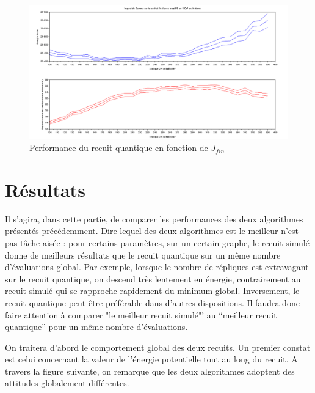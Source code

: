 \documentclass{article}%
\begin{document}
	\begin{figure}[!h]
	\begin{center}
	\includegraphics[scale=0.25]{gamma.png}
	\caption{Performance du recuit quantique en fonction de $ J_{fin} $}
	\label{gamma}
	\end{center}
	\end{figure}


\clearpage
\section{Résultats}

\vspace{1cm}

		Il s'agira, dans cette partie, de comparer les performances des deux algorithmes présentés précédemment. Dire lequel des deux algorithmes est le meilleur n'est pas tâche aisée : pour certains paramètres, sur un certain graphe, le recuit simulé donne de meilleurs résultats que le recuit quantique sur un même nombre d'évaluations global. Par exemple, lorsque le nombre de répliques est extravagant sur le recuit quantique, on descend très lentement en énergie, contrairement au recuit simulé qui se rapproche rapidement du minimum global. Inversement, le recuit quantique peut être préférable dans d'autres dispositions. Il faudra donc faire attention à comparer "le meilleur recuit simulé"' au "`meilleur recuit quantique"' pour un même nombre d'évaluations.
		
\vspace{1cm}

		On traitera d'abord le comportement global des deux recuits. Un premier constat est celui concernant la valeur de l'énergie potentielle tout au long du recuit. A travers la figure suivante, on remarque que les deux algorithmes adoptent des attitudes globalement différentes.
		
\end{document}
